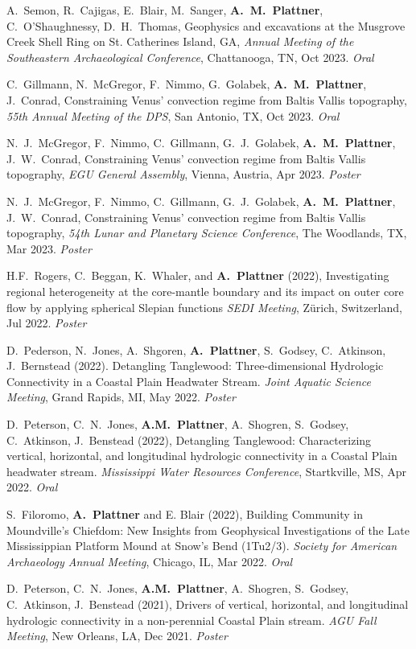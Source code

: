 \documentclass[10pt]{article}
\begin{document}
\spcp
A.~Semon, R.~Cajigas, E.~Blair, M.~Sanger, \textbf{A.~M.~Plattner}, C.~O'Shaughnessy, D.~H.~Thomas, Geophysics and excavations at the Musgrove Creek Shell Ring on St. Catherines Island, GA, \emph{Annual Meeting of the Southeastern Archaeological Conference}, Chattanooga, TN, Oct 2023. \emph{Oral}

\spcp C.~Gillmann, N.~McGregor, F.~Nimmo, G.~Golabek, \textbf{A.~M.~Plattner}, J.~Conrad, Constraining Venus' convection regime from Baltis Vallis topography, \emph{55th Annual Meeting of the DPS}, San Antonio, TX, Oct 2023. \emph{Oral}

\spcp N.~J.~McGregor, F.~Nimmo, C.~Gillmann, G.~J.~Golabek, \textbf{A.~M.~Plattner}, J.~W.~Conrad, Constraining Venus' convection regime from Baltis Vallis topography, \emph{EGU General Assembly}, Vienna, Austria, Apr 2023. \emph{Poster}

\spcp N.~J.~McGregor, F.~Nimmo, C.~Gillmann, G.~J.~Golabek, \textbf{A.~M.~Plattner}, J.~W.~Conrad, Constraining Venus' convection regime from Baltis Vallis topography, \emph{54th Lunar and Planetary Science Conference}, The Woodlands, TX, Mar 2023. \emph{Poster}

\spcp H.F.~Rogers, C.~Beggan, K.~Whaler, and \textbf{A.~Plattner}
(2022), Investigating regional heterogeneity at the core-mantle
boundary and its impact on outer core flow by applying spherical
Slepian functions \emph{SEDI Meeting}, Z\"urich, Switzerland, Jul 2022. \emph{Poster}

\spcp D.~Pederson, N.~Jones, A.~Shgoren, \textbf{A.~Plattner},
S.~Godsey, C.~Atkinson, J.~Bernstead (2022). Detangling Tanglewood:
Three-dimensional Hydrologic Connectivity in a Coastal Plain Headwater
Stream. \emph{Joint Aquatic Science Meeting}, Grand Rapids, MI, May
2022. \emph{Poster}

\spcp D.~Peterson, C.~N.~Jones, \textbf{A.M.~Plattner}, A.~Shogren,
S.~Godsey, C.~Atkinson, J.~Benstead (2022), Detangling Tanglewood:
Characterizing vertical, horizontal, and longitudinal hydrologic
connectivity in a Coastal Plain headwater stream. \emph{Mississippi
Water Resources Conference}, Startkville, MS, Apr 2022.  \emph{Oral}

\spcp S.~Filoromo, \textbf{A.~Plattner} and E. Blair (2022), Building
Community in Moundville's Chiefdom: New Insights from Geophysical
Investigations of the Late Mississippian Platform Mound at Snow's Bend
(1Tu2/3). \emph{Society for American Archaeology Annual Meeting}, Chicago,
IL, Mar 2022. \emph{Oral}

\spcp D.~Peterson, C.~N.~Jones, \textbf{A.M.~Plattner}, A.~Shogren,
S.~Godsey, C.~Atkinson, J.~Benstead (2021), Drivers of vertical,
horizontal, and longitudinal hydrologic connectivity in a
non-perennial Coastal Plain stream. \emph{AGU Fall Meeting}, New
Orleans, LA, Dec 2021. \emph{Poster}
\end{document}
